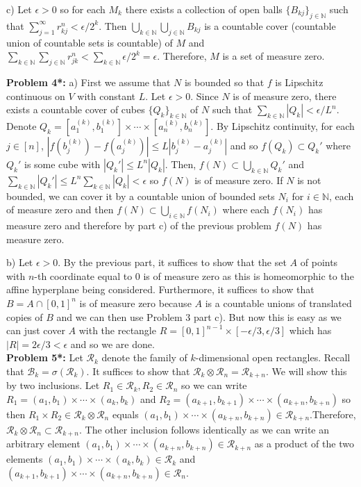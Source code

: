 \documentclass[12pt]{amsart} %
\newcommand\N{\ensuremath{\mathbb{N}}}
\def\N{\mathbb{N}}
\begin{document}
c) Let $\epsilon > 0$ so for each $M_k$ there exists a collection of open balls $\{B_{kj}\}_{j \in \N}$ such that $\sum_{j=1}^{\infty} r_{kj}^n < \epsilon/2^k$. Then $\bigcup_{k \in \N} \bigcup_{j \in \N} B_{kj}$ is a countable cover (countable union of countable sets is countable) of $M$ and  $\sum_{k \in \N} \sum_{j \in \N} r_{jk}^n < \sum_{k \in \N} \epsilon/2^k = \epsilon$. Therefore, $M$ is a set of measure zero. 



\bigskip
\noindent
\textbf{Problem 4*:}  a) First we assume that $N$ is bounded so that  $f$ is Lipschitz continuous on  $V$ with constant  $L$. Let $\epsilon > 0$. Since $N$ is of measure zero, there exists a countable cover of cubes $\{Q_k\}_{k \in \N}$ of $N$ such that  $\sum_{k \in \N} |Q_k| < \epsilon/L^n$. Denote $Q_k = [a_1^{(k)}, b_1^{(k)}] \times \cdots \times [a_n^{(k)}, b_n^{(k)}]$. By Lipschitz continuity, for each $j \in [n]$, $|f(b_j^{(k)}) - f( a_j^{(k)} )| \le L |b_j^{(k)} -  a_j^{(k)} |$ and so $f(Q_k) \subset Q_k'$ where $Q_k'$ is some cube with  $|Q_k'| \le  L^n |Q_k|$. Then, $f(N) \subset \bigcup_{k \in \N} Q_k'$ and $\sum_{k  \in \N} |Q_k'| \le  L^n\sum_{k  \in \N} |Q_k| < \epsilon$ so $f(N)$ is of measure zero. If $N$ is not bounded, we can cover it by a countable union of bounded sets $N_i$ for  $i \in \N$, each of measure zero and then $f(N) \subset \bigcup_{i \in \N} f(N_i)$ where each $f(N_i)$ has measure zero and therefore by part c) of the previous problem  $f(N)$ has measure zero.    

\medskip
b) Let $\epsilon > 0$. By the previous part, it suffices to show that the set $A$ of points with  $n$-th coordinate equal to  $0$ is of measure zero as this is homeomorphic to the affine hyperplane being considered. Furthermore, it suffices to show that $B = A \cap [0,1]^n$ is of measure zero because  $A$  is a countable unions of translated copies of $B$ and we can then use Problem 3 part c). But now this is easy as we can just cover $A$ with the rectangle $ R = [0,1]^{n-1} \times [-\epsilon/3, \epsilon/3]$ which has $|R| = 2\epsilon/3 < \epsilon$ and so we are done. \\ 

\bigskip
\noindent
\textbf{Problem 5*:} Let $\mathcal{R}_k$ denote the family of $k$-dimensional open rectangles. Recall that $\mathcal{B}_k = \sigma(\mathcal{R}_k)$. It suffices to show that $\mathcal{R}_k \otimes \mathcal{R}_n = \mathcal{R}_{k+n}$. We will show this by two inclusions. Let $R_1 \in \mathcal{R}_k, R_2 \in \mathcal{R}_n $ so we can write $R_1 = (a_1, b_1) \times \cdots \times (a_k, b_k)$ and  $R_2 =  (a_{k+1}, b_{k+1}) \times \cdots \times (a_{k+n}, b_{k+n})$ so then $R_1 \times R_2 \in \mathcal{R}_k \otimes \mathcal{R}_n$ equals $ (a_1, b_1) \times \cdots \times (a_{k+n}, b_{k+n}) \in \mathcal{R}_{k+n}$.Therefore, $\mathcal{R}_k \otimes \mathcal{R}_n \subset \mathcal{R}_{k+n}$. The other inclusion follows identically as we can write an arbitrary element $ (a_1, b_1) \times \cdots \times (a_{k+n}, b_{k+n}) \in \mathcal{R}_{k+n}$ as a product of the two elements $(a_1, b_1) \times \cdots \times (a_k, b_k) \in \mathcal{R}_k$ and $ (a_{k+1}, b_{k+1}) \times \cdots \times (a_{k+n}, b_{k+n}) \in \mathcal{R}_{n}$.





  \vfill 
 
\end{document}
